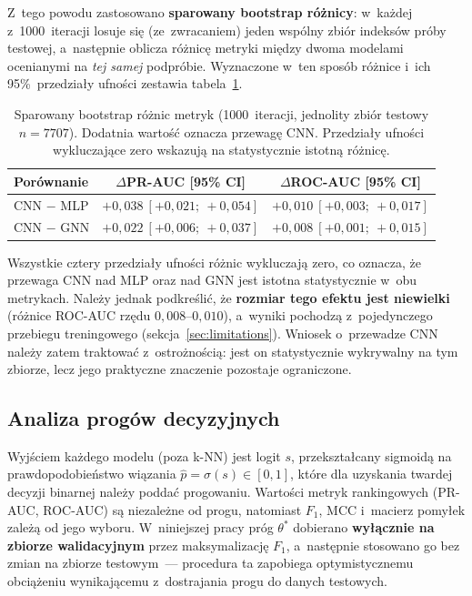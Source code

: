 \documentclass{SGGW-thesis}
\begin{document}
Z~tego powodu zastosowano \textbf{sparowany bootstrap różnicy}: w~każdej z~1000~iteracji losuje się
(ze~zwracaniem) jeden wspólny zbiór indeksów próby testowej, a~następnie oblicza różnicę metryki
między dwoma modelami ocenianymi na \textit{tej samej} podpróbie. Wyznaczone w~ten sposób różnice
i~ich 95\%~przedziały ufności zestawia tabela~\ref{tab:diff_ci}.

\begin{table}[htbp]
\centering
\small
\caption{Sparowany bootstrap różnic metryk (1000~iteracji, jednolity zbiór testowy $n{=}7707$).
Dodatnia wartość oznacza przewagę CNN. Przedziały ufności wykluczające zero wskazują na
statystycznie istotną różnicę.}
\label{tab:diff_ci}
\begin{tabular}{lcc}
\toprule
\textbf{Porównanie} & \textbf{$\Delta$PR-AUC [95\% CI]} & \textbf{$\Delta$ROC-AUC [95\% CI]} \\
\midrule
CNN $-$ MLP & $+0{,}038\ [+0{,}021;\ +0{,}054]$ & $+0{,}010\ [+0{,}003;\ +0{,}017]$ \\
CNN $-$ GNN & $+0{,}022\ [+0{,}006;\ +0{,}037]$ & $+0{,}008\ [+0{,}001;\ +0{,}015]$ \\
\bottomrule
\end{tabular}
\end{table}

Wszystkie cztery przedziały ufności różnic wykluczają zero, co oznacza, że przewaga CNN nad
MLP oraz nad GNN jest istotna statystycznie w~obu metrykach. Należy jednak podkreślić, że
\textbf{rozmiar tego efektu jest niewielki} (różnice ROC-AUC rzędu $0{,}008$--$0{,}010$), a~wyniki
pochodzą z~pojedynczego przebiegu treningowego (sekcja~\ref{sec:limitations}). Wniosek o~przewadze
CNN należy zatem traktować z~ostrożnością: jest on statystycznie wykrywalny na tym zbiorze, lecz
jego praktyczne znaczenie pozostaje ograniczone.

\subsection{Analiza progów decyzyjnych}
\label{sec:thresholds}

Wyjściem każdego modelu (poza k-NN) jest logit $s$, przekształcany sigmoidą na prawdopodobieństwo
wiązania $\hat{p} = \sigma(s) \in [0,1]$, które dla uzyskania twardej decyzji binarnej należy poddać progowaniu. Wartości metryk rankingowych
(PR-AUC, ROC-AUC) są niezależne od progu, natomiast $F_1$, MCC i~macierz pomyłek zależą od jego
wyboru. W~niniejszej pracy próg $\theta^*$ dobierano \textbf{wyłącznie na zbiorze walidacyjnym}
przez maksymalizację $F_1$, a~następnie stosowano go bez zmian na zbiorze testowym~--- procedura ta
zapobiega optymistycznemu obciążeniu wynikającemu z~dostrajania progu do danych testowych.
\end{document}
